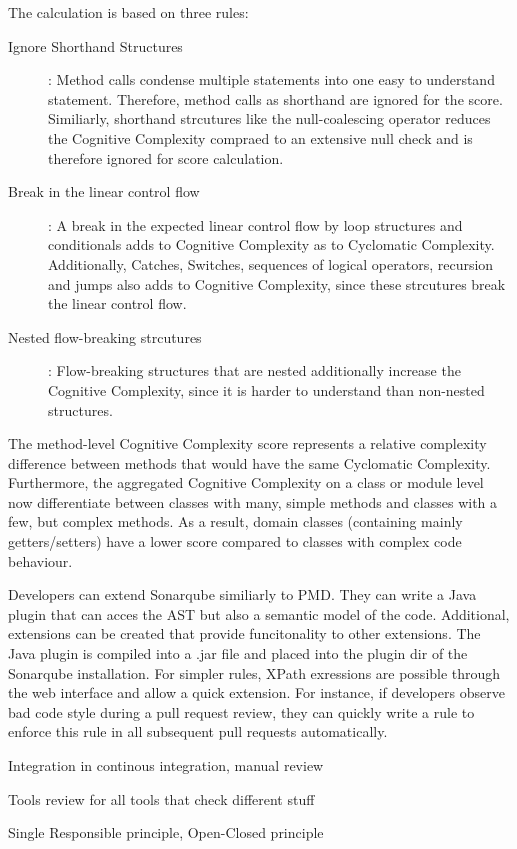 The calculation is based on three rules\cite{campbell2018cognitive}:
\begin{description}
    \item[Ignore Shorthand Structures]: Method calls condense multiple statements into one easy to understand statement. Therefore, method calls as shorthand are ignored for the score. Similiarly, shorthand strcutures like the null-coalescing operator reduces the Cognitive Complexity compraed to an extensive null check and is therefore ignored for score calculation.
    \item[Break in the linear control flow]: A break in the expected linear control flow by loop structures and conditionals adds to Cognitive Complexity as to Cyclomatic Complexity. Additionally, Catches, Switches, sequences of logical operators, recursion and jumps also adds to Cognitive Complexity, since these strcutures break the linear control flow.
    \item[Nested flow-breaking strcutures]: Flow-breaking structures that are nested additionally increase the Cognitive Complexity, since it is harder to understand than non-nested structures.  
\end{description}
The method-level Cognitive Complexity score represents a relative complexity difference between methods that would have the same Cyclomatic Complexity. Furthermore, the aggregated Cognitive Complexity on a class or module level now differentiate between classes with many, simple methods and classes with a few, but complex methods. As a result, domain classes (containing mainly getters/setters) have a lower score compared to classes with complex code behaviour\cite{campbell2018cognitive}.

Developers can extend Sonarqube similiarly to PMD. They can write a Java plugin that can acces the AST but also a semantic model of the code. Additional, extensions can be created that provide funcitonality to other extensions. The Java plugin is compiled into a .jar file and placed into the plugin dir of the Sonarqube installation. For simpler rules, XPath exressions are possible through the web interface and allow a quick extension. For instance, if developers observe bad code style during a pull request review, they can quickly write a rule to enforce this rule in all subsequent pull requests automatically.

Integration in continous integration, manual review

Tools review for all tools that check different stuff

Single Responsible principle, Open-Closed principle

